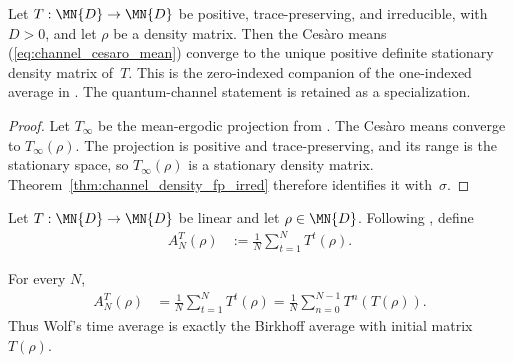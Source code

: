 \begin{theorem}
    \label{thm:channel_cesaro_irred}
    \leanok
    Let $T:\MN{D}\to\MN{D}$ be positive, trace-preserving, and irreducible,
    with $D>0$, and let $\rho$ be a density matrix.
    Then the Ces\`aro means (\ref{eq:channel_cesaro_mean}) converge to the
    unique positive definite stationary density matrix of~$T$.
    This is the zero-indexed companion of the one-indexed average in
    \cite[Equation~(6.35)]{Wolf2012Quantum}. The quantum-channel statement is
    retained as a specialization.
\end{theorem}

\begin{proof}
    \leanok
    Let $T_\infty$ be the mean-ergodic projection from
    \cite[Equation~(6.14)]{Wolf2012Quantum}. The Ces\`aro means converge to
    $T_\infty(\rho)$. The projection is positive and trace-preserving, and its
    range is the stationary space, so $T_\infty(\rho)$ is a stationary density
    matrix. Theorem~\ref{thm:channel_density_fp_irred} therefore identifies it
    with~$\sigma$.
\end{proof}

\begin{definition}
    \label{def:time_average}
    \leanok
    Let $T:\MN{D}\to\MN{D}$ be linear and let $\rho\in\MN{D}$. Following
    \cite[Equation~(6.35)]{Wolf2012Quantum}, define
    \begin{align}
        A_N^T(\rho)
        &:=\frac{1}{N}\sum_{t=1}^{N}T^t(\rho).
        \label{eq:qpf_time_average}
    \end{align}
\end{definition}

\begin{theorem}
    \label{thm:time_average_reindexing}
    \leanok
    For every $N$,
    \begin{align}
        A_N^T(\rho)
        &=\frac{1}{N}\sum_{t=1}^{N}T^t(\rho)
          =\frac{1}{N}\sum_{n=0}^{N-1}T^n(T(\rho)).
        \label{eq:qpf_time_average_reindexing}
    \end{align}
    Thus Wolf's time average is exactly the Birkhoff average with initial
    matrix $T(\rho)$.
\end{theorem}

